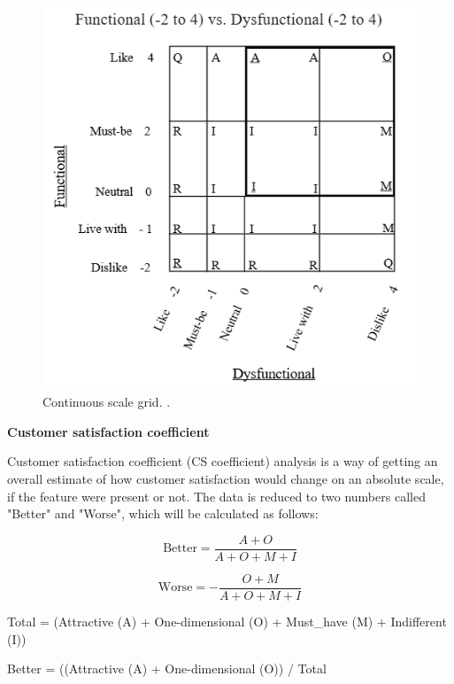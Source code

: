 \documentclass[../main.tex]{subfiles}
\begin{document}
\begin{figure}[H]
        \centering
        \includegraphics[scale=1]{img/3-background/kano/analysis.png}
        \caption{Continuous scale grid. \cite{berger1993kano}.}
        \label{fig:analysis}
\end{figure}

\textbf{Customer satisfaction coefficient}

Customer satisfaction coefficient (CS coefficient) analysis is a way of getting an overall estimate of how customer satisfaction would change on an absolute scale, if the feature were present or not. The data is reduced to two numbers called "Better" and "Worse", which will be calculated as follows: \cite{timko1993}

\begin{equation}
    \text{Better} = \frac{A + O}{A + O + M + I}
\end{equation}

\begin{equation}
    \text{Worse} = - \frac{O + M }{A + O + M + I}
\end{equation}

Total = (Attractive (A) + One-dimensional (O) + Must\_have (M) + Indifferent (I))

Better = ((Attractive (A) + One-dimensional (O)) / Total
\end{document}
